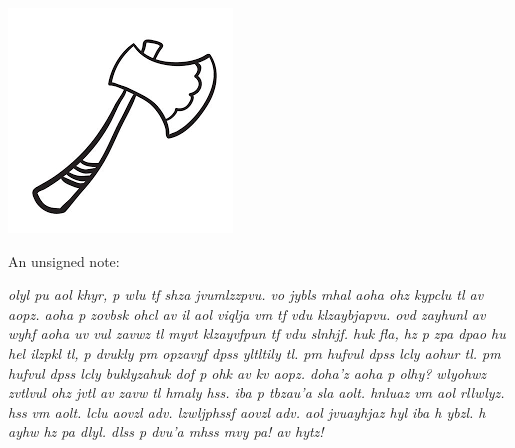 \documentclass[white]{gl2018}
\begin{document}
\name{\wLindenFour{}}

\begin{center}
\includegraphics[scale=.2]{Axe}
\end{center}

An unsigned note:

\begin{changemargin}{3cm}{3cm}
\emph{olyl pu aol khyr, p wlu tf shza jvumlzzpvu. vo jybls mhal aoha ohz kypclu tl av aopz. aoha p zovbsk ohcl av il aol viqlja vm tf vdu klzaybjapvu. ovd zayhunl av wyhf aoha uv vul zavwz tl myvt klzayvfpun tf vdu slnhjf. huk fla, hz p zpa dpao hu hel ilzpkl tl, p dvukly pm opzavyf dpss yltltily tl. pm hufvul dpss lcly aohur tl. pm hufvul dpss lcly buklyzahuk dof p ohk av kv aopz. doha’z aoha p olhy? wlyohwz zvtlvul ohz jvtl av zavw tl hmaly hss. iba p tbzau’a sla aolt. hnluaz vm aol rllwlyz. hss vm aolt. lclu aovzl adv. lzwljphssf aovzl adv. aol jvuayhjaz hyl iba h ybzl. h ayhw hz pa dlyl. dlss p dvu’a mhss mvy pa! av hytz!}
\end{changemargin}
\end{document}
